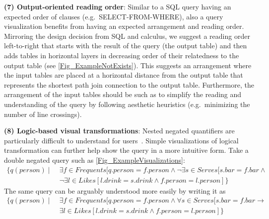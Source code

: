\documentclass[letterpaper,11pt]{article}
\begin{document}
\textbf{(7) Output-oriented reading order}:
Similar to a SQL query having an expected order of clauses (e.g.\ SELECT-FROM-WHERE),
also a query visualization benefits from having an expected arrangement and reading order.
Mirroring the design decision from SQL and calculus, we suggest a reading order left-to-right 
that starts with the result of the query (the output table) 
and then adds tables in horizontal layers in decreasing order of their relatedness to the output table (see \autoref{Fig_ExampleNotExists}). 
This suggests an arrangement where the input tables are placed at a horizontal distance from the output table that represents the shortest path join connection to the output table.
Furthermore, the arrangement of the input tables should 
be such as to simplify the reading and understanding of the query 
by following aesthetic heuristics (e.g.\ minimizing the number of line crossings).






\textbf{(8) Logic-based visual transformations}:
Nested negated quantifiers are particularly difficult to understand for users~\cite{DBLP:journals/csur/Reisner81,Reisner1975:HumanFactors}.
Simple visualizations of logical transformation can further help show the query in a more intuitive form.
Take a double negated query such as \autoref{Fig_ExampleVisualizations}:
\begin{align*}
	\{ q(\textit{person}) \mid \;
	& \exists f \in \textit{Frequents}
	[
	q.\textit{person} = f.\textit{person} \wedge
	\neg \exists s \in \textit{Serves} [s.\textit{bar} = f.\textit{bar} \wedge
	\\
	&\neg \exists l \in \textit{Likes} [
	l.\textit{drink} = s.\textit{drink} \wedge 	
	f.\textit{person} = l.\textit{person}	
	] \}	
\end{align*}
The same query can be arguably understood more easily by writing it as
\begin{align*}
	\{ q(\textit{person}) \mid \;
	& \exists f \in \textit{Frequents}
	[
	q.\textit{person} = f.\textit{person} \wedge
	\forall s \in \textit{Serves} [s.\textit{bar} = f.\textit{bar} \rightarrow
	\\
	&\exists l \in \textit{Likes} [
	l.\textit{drink} = s.\textit{drink} \wedge 	
	f.\textit{person} = l.\textit{person}	
	] \}	
\end{align*}
\end{document}
